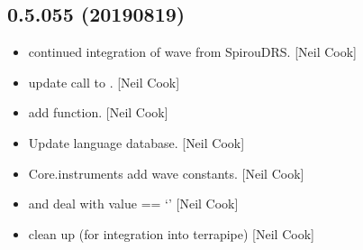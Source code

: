 \documentclass[a4paper,10pt,english]{report}
\begin{document}
\subsection{0.5.055 (2019\sphinxhyphen{}08\sphinxhyphen{}19)}
\label{\detokenize{misc/changelog:id107}}\begin{itemize}
\item {} 
 \sphinxhyphen{} continued integration of wave from SpirouDRS.
{[}Neil Cook{]}

\item {} 
 \sphinxhyphen{} update call to . {[}Neil Cook{]}

\item {} 
 \sphinxhyphen{} add  function. {[}Neil Cook{]}

\item {} 
Update language database. {[}Neil Cook{]}

\item {} 
Core.instruments \sphinxhyphen{} add wave constants. {[}Neil Cook{]}

\item {} 
 \sphinxhyphen{}  and
 \sphinxhyphen{} deal with value == ‘’ {[}Neil Cook{]}

\item {} 
 \sphinxhyphen{} clean up (for integration into terrapipe) {[}Neil Cook{]}

\end{itemize}
\end{document}
